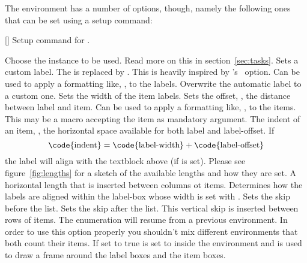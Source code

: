 \documentclass[load-preamble+]{cnltx-doc}
\begin{document}
The environment  has a number of options, though, namely the
following ones that can be set using a setup command:
\begin{commands}
  []
    Setup command for \Tasks.
\end{commands}
\begin{options}
  \Default
     Choose the instance to be used.  Read more on this in
     section~\ref{sec:tasks}.
    Sets a custom label.  The \code{*} is replaced by
    .  This is heavily inspired by
    's~\cite{pkg:enumitem}  option.
  \Default
    Can be used to apply a formatting like, \eg,
     to the labels.
  \Default
    Overwrite the automatic label to a custom one.
  \Default{1em}
    Sets the width of the item labels.
  \Default{.3333em}
    Sets the offset, \ie, the distance between label and
    item.
  \Default
    Can be used to apply a formatting like, \eg,
     to the items. This may be a macro accepting the item as
    mandatory argument.
  \Default{2.5em}
    The indent of an item, \ie, the horizontal space
    available for both label and label-offset.  If
    \[
      \text{\code{indent}} =
      \text{\code{label-width}} + \text{\code{label-offset}}
    \]
    the label will align with the textblock above (if
     is set).  Please see figure~\ref{fig:lengths}
    for a sketch of the available lengths and how they are set.
  \Default{0pt}
    A horizontal length that is inserted between columns ot
    items.
    Determines how the labels are aligned within the
    label-box whose width is set with .
  \Default{0pt}
    Sets the skip before the list.
  \Default{0pt}
    Sets the skip after the list.
    This vertical skip is inserted between rows of items.
    The enumeration will resume from a previous  environment.  In
    order to use this option properly you shouldn't mix different 
    environments that both count their items.
    If set to true  is set to \code{0pt}
    inside the  environment and  is used to draw a frame
    around the label boxes and the item boxes.
\end{options}
\end{document}
